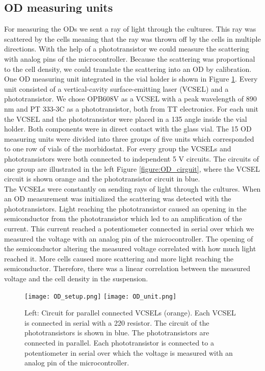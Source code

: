 \subsection{OD measuring units}
For measuring the ODs we sent a ray of light through the cultures. This ray was scattered by the cells meaning that the ray was thrown off by the cells in multiple directions. With the help of a phototransistor we could measure the scattering with analog pins of the microcontroller. Because the scattering was proportional to the cell density, we could translate the scattering into an OD by calibration. \\
One OD measuring unit integrated in the vial holder is shown in Figure \ref{figure:OD_unit}. Every unit consisted of a vertical-cavity surface-emitting laser (VCSEL) and a phototransistor. We chose OPB608V as a VCSEL with a peak wavelength of 890 nm and PT 333-3C as a phototransistor, both from TT electronics. For each unit the VCSEL and the phototransistor were placed in a 135 \degree \space angle inside the vial holder. Both components were in direct contact with the glass vial.
The 15 OD measuring units were divided into three groups of five units which corresponded to one row of vials of the morbidostat. For every group the VCSELs and phototransistors were both connected to independent 5 V circuits. The circuits of one group are illustrated in the left Figure \ref{figure:OD_cirguit}, where the VCSEL circuit is shown orange and the phototransistor circuit in blue. \\
The VCSELs were constantly on sending rays of light through the cultures. When an OD measurement was initialized the scattering was detected with the phototransistors. Light reaching the phototransistor caused an opening in the semiconductor from the phototransistor which led to an amplification of the current. This current reached a potentiometer connected in serial over which we measured the voltage with an analog pin of the microcontroller. The opening of the semiconductor altering the measured voltage correlated with how much light reached it. More cells caused more scattering and more light reaching the semiconductor. Therefore, there was a linear correlation between the measured voltage and the cell density in the suspension. \\

\label{section:OD}
\begin{figure}
	\texttt{[image: OD\_setup.png]}
	\texttt{[image: OD\_unit.png]}
	\caption{Left: Circuit for parallel connected VCSELs (orange). Each VCSEL is connected in serial with a 220 \textOmega \space resistor. The circuit of the phototransistors is shown in blue. The phototransistors are connected in parallel. Each phototransistor is connected to a potentiometer in serial over which the voltage is measured with an analog pin of the microcontroller.}
	\label{figure:OD_cirguit}
	\label{figure:OD_unit}
\end{figure}
\newpage
